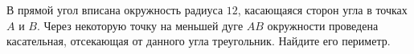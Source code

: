 \begin{ex}
	\begin{condition}
		В прямой угол вписана окружность радиуса \( 12 \), касающаяся сторон угла в точках \( A  \) и \( B \). Через некоторую точку	на меньшей дуге \( AB  \) окружности проведена касательная, отсекающая от данного угла треугольник. Найдите его периметр.
	\end{condition}
\end{ex}